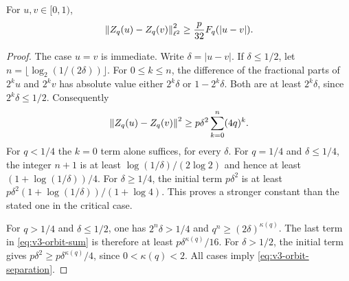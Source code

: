 \begin{lemma}\label{lem:v3-orbit-separation}
For $u,v\in[0,1)$,
\begin{equation}\label{eq:v3-orbit-separation}
 \left\lVert Z_q(u)-Z_q(v)\right\rVert_{\ell^2}^2
 \ge \frac p{32}F_q(|u-v|).
\end{equation}
\end{lemma}
\begin{proof}
The case $u=v$ is immediate. Write $\delta=|u-v|$.
If $\delta\le1/2$, let
$n=\lfloor\log_2(1/(2\delta))\rfloor$. For $0\le k\le n$, the
difference of the fractional parts of $2^ku$ and $2^kv$ has absolute
value either $2^k\delta$ or $1-2^k\delta$. Both are at least
$2^k\delta$, since $2^k\delta\le1/2$. Consequently
\begin{equation}\label{eq:v3-orbit-sum}
 \left\lVert Z_q(u)-Z_q(v)\right\rVert^2
 \ge p\delta^2\sum_{k=0}^n(4q)^k.
\end{equation}
For $q<1/4$ the $k=0$ term alone suffices, for every $\delta$.
For $q=1/4$ and $\delta\le1/4$, the integer $n+1$ is at least
$\log(1/\delta)/(2\log2)$ and hence at least
$(1+\log(1/\delta))/4$. For $\delta\ge1/4$, the initial term
$p\delta^2$ is at least
$p\delta^2(1+\log(1/\delta))/(1+\log4)$.
This proves a stronger constant than the stated one in the critical case.

For $q>1/4$ and $\delta\le1/2$, one has
$2^n\delta>1/4$ and $q^n\ge(2\delta)^{\kappa(q)}$.
The last term in \eqref{eq:v3-orbit-sum} is therefore at least
$p\delta^{\kappa(q)}/16$. For $\delta>1/2$, the initial term gives
$p\delta^2\ge p\delta^{\kappa(q)}/4$, since $0<\kappa(q)<2$.
All cases imply \eqref{eq:v3-orbit-separation}.
\end{proof}

